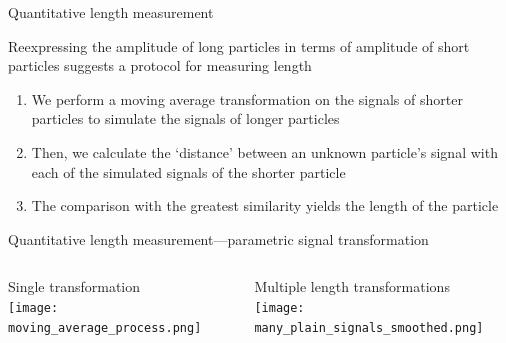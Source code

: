 \begin{frame}[c]{Quantitative length measurement}
	

	{\footnotesize
		Reexpressing the amplitude of long particles in terms of amplitude of short particles suggests a protocol for measuring length \\
		\begin{enumerate}
			\item We perform a moving average transformation on the signals of shorter particles to simulate the signals of longer particles \\
			\item Then, we calculate the `distance' between an unknown particle's signal with each of the simulated signals of the shorter particle \\
			\item The comparison with the greatest similarity yields the length of the particle
		\end{enumerate}
	}
	


\end{frame}




\begin{frame}[c]{Quantitative length measurement---parametric signal transformation}
	\begin{columns}[t]
	
		\begin{column}[T]{2.25in}
			{\centering
				Single transformation \\
				\texttt{[image: moving\_average\_process.png]} \\
				\par
			}
		\end{column}
		\hfill
		\begin{column}[T]{2.25in}
			{\centering
				Multiple length transformations \\
				\texttt{[image: many\_plain\_signals\_smoothed.png]} \\
				\par
			}
		\end{column}

	\end{columns}
	


\end{frame}



